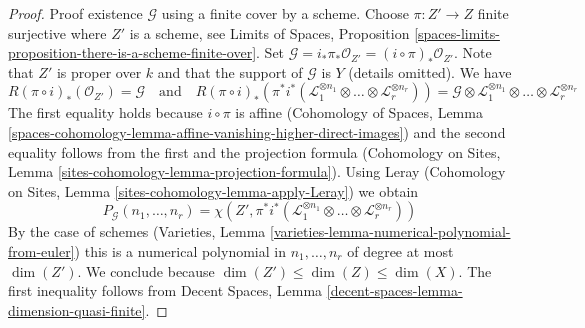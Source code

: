 \begin{proof}
\medskip\noindent
Proof existence $\mathcal{G}$ using a finite cover by a scheme.
Choose $\pi : Z' \to Z$ finite surjective where $Z'$ is a scheme, see
Limits of Spaces, Proposition
\ref{spaces-limits-proposition-there-is-a-scheme-finite-over}.
Set $\mathcal{G} = i_*\pi_*\mathcal{O}_{Z'} = (i \circ \pi)_*\mathcal{O}_{Z'}$.
Note that $Z'$ is proper over $k$ and that the support of $\mathcal{G}$ is $Y$
(details omitted). We have
$$
R(\pi \circ i)_*(\mathcal{O}_{Z'}) = \mathcal{G}
\quad\text{and}\quad
R(\pi \circ i)_*(\pi^*i^*(\mathcal{L}_1^{\otimes n_1} \otimes \ldots \otimes
\mathcal{L}_r^{\otimes n_r})
) = \mathcal{G} \otimes \mathcal{L}_1^{\otimes n_1} \otimes \ldots \otimes
\mathcal{L}_r^{\otimes n_r}
$$
The first equality holds because $i \circ \pi$ is affine
(Cohomology of Spaces, Lemma
\ref{spaces-cohomology-lemma-affine-vanishing-higher-direct-images})
and the second equality follows from the first and the projection formula
(Cohomology on Sites, Lemma \ref{sites-cohomology-lemma-projection-formula}).
Using Leray
(Cohomology on Sites, Lemma \ref{sites-cohomology-lemma-apply-Leray})
we obtain
$$
P_\mathcal{G}(n_1, \ldots, n_r) =
\chi(Z', \pi^*i^*(\mathcal{L}_1^{\otimes n_1} \otimes \ldots \otimes
\mathcal{L}_r^{\otimes n_r}))
$$
By the case of schemes
(Varieties, Lemma \ref{varieties-lemma-numerical-polynomial-from-euler})
this is a numerical polynomial in
$n_1, \ldots, n_r$ of degree at most $\dim(Z')$.
We conclude because $\dim(Z') \leq \dim(Z) \leq \dim(X)$.
The first inequality follows from
Decent Spaces, Lemma \ref{decent-spaces-lemma-dimension-quasi-finite}.


\end{proof}
